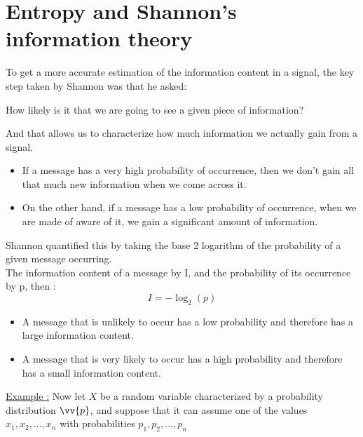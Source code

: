 \documentclass[12pt,oneside]{book}
\begin{document}
\section{Entropy and Shannon's information theory}
To get a more accurate estimation of the information content in a signal, the key step taken by Shannon was that he asked:\\
\begin{center}
    How likely is it that we are going to see a given piece of information?
\end{center}
And that allows us to characterize how much information we actually gain from a signal.\\
\begin{itemize}
    \item If a message has a very high probability of occurrence, then we don’t gain all that much new information when we come across it.
    \item On the other hand, if a message has a low probability of occurrence, when we are made of aware of it, we gain a significant amount of information.
\end{itemize}
Shannon quantified this by taking the base 2 logarithm of the probability of a given message occurring.\\
The information content of a message by I, and the probability of its occurrence by p, then :
\[I = -\log_2(p)\]
\begin{itemize}
    \item A message that is unlikely to occur has a low probability and therefore has a large information content.
    \item A message that is very likely to occur has a high probability and therefore has a small information content.
\end{itemize}
\underline{Example :}
Now let $X$ be a random variable characterized by a probability distribution $\vv{p}$, and suppose that it can assume one of the values $x_1,x_2,...,x_n$ with probabilities $p_1,p_2,...,p_n$\\
\end{document}
